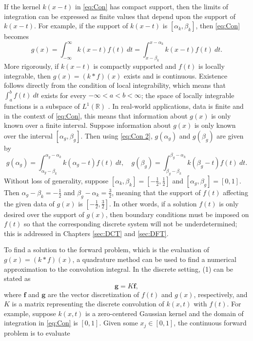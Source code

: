 \documentclass[12pt,notitlepage]{report}
\newcommand{\gVec}{\mathbf{g}}	%
\newcommand{\kMat}{K}	%
\newcommand{\fVec}{\mathbf{f}}	%
\begin{document}
If the kernel $k(x-t)$ in \eqref{eq:Con} has compact support, then the limits of integration can be expressed as finite values that depend upon the support of $k(x-t)$. For example, if the support of $k(x-t)$ is $[\alpha_k,\beta_k]$, then \eqref{eq:Con} becomes
\begin{equation}
\label{eq:Con 2}
g(x) = \int_{-\infty}^{\infty} k(x-t)f(t) ~dt = \int_{x-\beta_k}^{x-\alpha_k} k(x-t)f(t) ~dt.
\end{equation} 
More rigorously, if $k(x-t)$ is compactly supported and $f(t)$ is locally integrable, then $g(x) = (k*f)(x)$ exists and is continuous. Existence follows directly from the condition of local integrability, which means that $\int_a^b f(t) ~dt$ exists for every $-\infty < a < b < \infty$; the space of locally integrable functions is a subspace of $L^1(\mathbb{R})$ \cite[p.~63]{DebnathMikusinski2005}. In real-world applications, data is finite and in the context of \eqref{eq:Con}, this means that information about $g(x)$ is only known over a finite interval. Suppose information about $g(x)$ is only known over the interval $[\alpha_g,\beta_g]$. Then using \eqref{eq:Con 2}, $g(\alpha_g)$ and $g(\beta_g)$ are given by
\[g(\alpha_g) = \int_{\alpha_g-\beta_k}^{\alpha_g-\alpha_k} k(\alpha_g - t)f(t) ~dt, \quad g(\beta_g) = \int_{\beta_g - \beta_k}^{\beta_g - \alpha_k} k(\beta_g-t)f(t) ~dt.\]
Without loss of generality, suppose $[\alpha_k,\beta_k] = [-\frac{1}{2},\frac{1}{2}]$ and $[\alpha_g,\beta_g] = [0,1]$. Then $\alpha_g-\beta_k = -\frac{1}{2}$ and $\beta_g - \alpha_k = \frac{3}{2}$, meaning that the support of $f(t)$ affecting the given data of $g(x)$ is $[-\frac{1}{2},\frac{3}{2}]$. In other words, if a solution $f(t)$ is only desired over the support of $g(x)$, then boundary conditions must be imposed on $f(t)$ so that the corresponding discrete system will not be underdetermined; this is addressed in Chapters \ref{sec:DCT} and \ref{sec:DFT}. \par 
To find a solution to the forward problem, which is the evaluation of $g(x) = (k * f)(x)$, a quadrature method can be used to find a numerical approximation to the convolution integral. In the discrete setting, (1) can be stated as
\begin{equation}
\gVec = \kMat\fVec,
\label{eq:Dis}
\end{equation}
where $\fVec$ and $\gVec$ are the vector discretization of $f(t)$ and $g(x)$, respectively, and $\kMat$ is a matrix representing the discrete convolution of $k(x,t)$ with $f(t)$. For example, suppose $k(x,t)$ is a zero-centered Gaussian kernel and the domain of integration in \eqref{eq:Con} is $[0,1]$. Given some $x_j \in [0,1]$, the continuous forward problem is to evaluate
\end{document}

